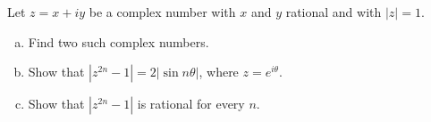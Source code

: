 Let $z = x + iy$ be a complex number with $x$ and $y$ rational and with
$|z| = 1$.

\begin{enumerate}[(a)]

\item Find two such complex numbers.

\item Show that $\left| z^{2n} - 1 \right| = 2 \left| \sin n \theta \right|$,
      where $z = e^{i \theta}$.

\item Show that $\left| z^{2n} - 1 \right|$ is rational for every $n$.

\end{enumerate}
